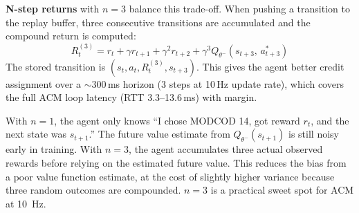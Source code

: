 \documentclass[12pt,a4paper]{report}
\begin{document}
\textbf{N-step returns} with $n = 3$ balance this trade-off. When pushing
a transition to the replay buffer, three consecutive transitions are
accumulated and the compound return is computed:
\begin{equation}
    R_t^{(3)} = r_t + \gamma r_{t+1} + \gamma^2 r_{t+2} +
    \gamma^3 Q_{\theta^-}(s_{t+3},\, a^*_{t+3})
\end{equation}
The stored transition is $(s_t, a_t, R_t^{(3)}, s_{t+3})$.
This gives the agent better credit assignment over a $\sim$300\,ms horizon
(3 steps at 10\,Hz update rate), which covers the full ACM loop latency
(RTT 3.3--13.6\,ms) with margin.

\begin{plainenglish}
With $n=1$, the agent only knows ``I chose MODCOD 14, got reward $r_t$, and the
next state was $s_{t+1}$.''  The future value estimate from $Q_{\theta^-}(s_{t+1})$
is still noisy early in training.  With $n=3$, the agent accumulates three
actual observed rewards before relying on the estimated future value.  This
reduces the bias from a poor value function estimate, at the cost of slightly
higher variance because three random outcomes are compounded.  $n=3$ is a
practical sweet spot for ACM at 10~Hz.
\end{plainenglish}
\end{document}
